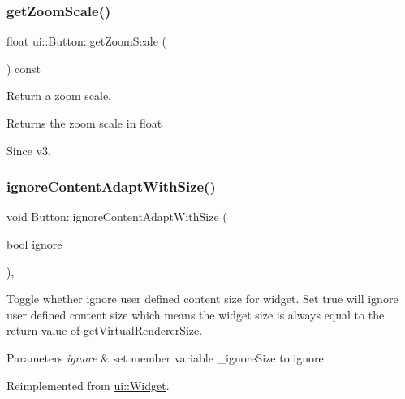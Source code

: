 \subsubsection{\texorpdfstring{get\+Zoom\+Scale()}{getZoomScale()}\hspace{0.1cm}{\footnotesize\ttfamily [2/2]}}
{\footnotesize\ttfamily float ui\+::\+Button\+::get\+Zoom\+Scale (\begin{DoxyParamCaption}{ }\end{DoxyParamCaption}) const}



Return a zoom scale. 

\begin{DoxyReturn}{Returns}
the zoom scale in float 
\end{DoxyReturn}
\begin{DoxySince}{Since}
v3. 
\end{DoxySince}
\mbox{\label{classui_1_1Button_acc4c34750dcf72800cebb9bcd3a45b11}} 
\subsubsection{\texorpdfstring{ignore\+Content\+Adapt\+With\+Size()}{ignoreContentAdaptWithSize()}\hspace{0.1cm}{\footnotesize\ttfamily [1/2]}}
{\footnotesize\ttfamily void Button\+::ignore\+Content\+Adapt\+With\+Size (\begin{DoxyParamCaption}\item[{bool}]{ignore }\end{DoxyParamCaption})\hspace{0.3cm}{\ttfamily [override]}, {\ttfamily [virtual]}}

Toggle whether ignore user defined content size for widget. Set true will ignore user defined content size which means the widget size is always equal to the return value of {\ttfamily get\+Virtual\+Renderer\+Size}.


\begin{DoxyParams}{Parameters}
{\em ignore} & set member variable \+\_\+ignore\+Size to ignore \\
\hline
\end{DoxyParams}


Reimplemented from \hyperlink{classui_1_1Widget_a47ec556e48f2ac20290c197e30434d36}{ui\+::\+Widget}.

